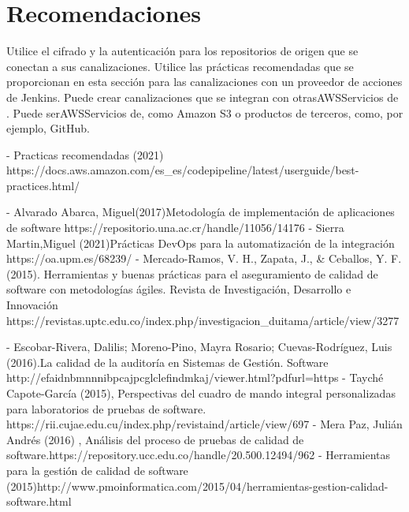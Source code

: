 \documentclass[twoside,twocolumn]{article}
\begin{document}
\section{Recomendaciones}
Utilice el cifrado y la autenticación para los repositorios de origen que se conectan a sus canalizaciones.
Utilice las prácticas recomendadas que se proporcionan en esta sección para las canalizaciones con un proveedor de acciones de Jenkins.
Puede crear canalizaciones que se integran con otrasAWSServicios de . Puede serAWSServicios de, como Amazon S3 o productos de terceros, como, por ejemplo, GitHub.


\newpage
\begin{thebibliography}{99}
\bibitem - Practicas recomendadas (2021) https://docs.aws.amazon.com/es_es/codepipeline/latest/userguide/best-practices.html/
	
	\bibitem - Alvarado Abarca, Miguel(2017)Metodología de implementación de aplicaciones de software  https://repositorio.una.ac.cr/handle/11056/14176
	\bibitem - Sierra Martin,Miguel (2021)Prácticas DevOps para la automatización de la integración https://oa.upm.es/68239/
    \bibitem - Mercado-Ramos, V. H., Zapata, J., & Ceballos, Y. F. (2015). Herramientas y buenas prácticas para el aseguramiento de calidad de software con metodologías ágiles. Revista de Investigación, Desarrollo e Innovación https://revistas.uptc.edu.co/index.php/investigacion_duitama/article/view/3277
    
    \bibitem - Escobar-Rivera, Dalilis; Moreno-Pino, Mayra Rosario; Cuevas-Rodríguez, Luis (2016).La calidad de la auditoría en Sistemas de Gestión. Software http://efaidnbmnnnibpcajpcglclefindmkaj/viewer.html?pdfurl=https%
    \bibitem - Tayché Capote-García (2015), Perspectivas del cuadro de mando integral personalizadas para laboratorios de pruebas de software. https://rii.cujae.edu.cu/index.php/revistaind/article/view/697
    \bibitem - Mera Paz, Julián Andrés (2016) , Análisis del proceso de pruebas de calidad de software.https://repository.ucc.edu.co/handle/20.500.12494/962
    \bibitem - Herramientas para la gestión de calidad de software (2015)http://www.pmoinformatica.com/2015/04/herramientas-gestion-calidad-software.html

	\end{thebibliography}

\end{document}
